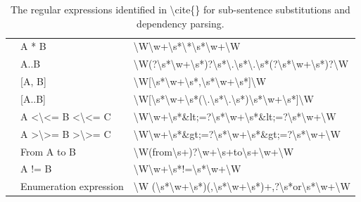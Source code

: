 \begin{table}[]
\begin{tabular}{|l|l|l|}
		& A * B & \textbackslash{}W\textbackslash{}w+\textbackslash{}s*\textbackslash{}*\textbackslash{}s*\textbackslash{}w+\textbackslash{}W \\ \cline{2-3} 
		& A..B & \textbackslash{}W(?\textbackslash{}s*\textbackslash{}w+\textbackslash{}s*)?\textbackslash{}s*\textbackslash{}.\textbackslash{}s*\textbackslash{}.\textbackslash{}s*(?\textbackslash{}s*\textbackslash{}w+\textbackslash{}s*)?\textbackslash{}W \\ \cline{2-3} 
		& {[}A, B{]} & \textbackslash{}W[\textbackslash{}s*\textbackslash{}w+\textbackslash{}s*,\textbackslash{}s*\textbackslash{}w+\textbackslash{}s*]\textbackslash{}W \\ \cline{2-3} 
		& {[}A..B{]} & \textbackslash{}W[\textbackslash{}s*\textbackslash{}w+\textbackslash{}s*(\textbackslash{}.\textbackslash{}s*\textbackslash{}.\textbackslash{}s*)\textbackslash{}s*\textbackslash{}w+\textbackslash{}s*]\textbackslash{}W \\ \cline{2-3} 
		& A \textless{}\textbackslash{}\textless{}= B \textless{}\textbackslash{}\textless{}= C & \textbackslash{}W\textbackslash{}w+\textbackslash{}s*\&lt;=?\textbackslash{}s*\textbackslash{}w+\textbackslash{}s*\&lt;=?\textbackslash{}s*\textbackslash{}w+\textbackslash{}W \\ \cline{2-3} 
		& A \textgreater{}\textbackslash{}\textgreater{}= B \textgreater{}\textbackslash{}\textgreater{}= C & \textbackslash{}W\textbackslash{}w+\textbackslash{}s*\&gt;=?\textbackslash{}s*\textbackslash{}w+\textbackslash{}s*\&gt;=?\textbackslash{}s*\textbackslash{}w+\textbackslash{}W \\ \cline{2-3} 
		& From A to B & \textbackslash{}W(from\textbackslash{}s+)?\textbackslash{}w+\textbackslash{}s+to\textbackslash{}s+\textbackslash{}w+\textbackslash{}W \\ \cline{2-3} 
		& A != B & \textbackslash{}W\textbackslash{}w+\textbackslash{}s*!=\textbackslash{}s*\textbackslash{}w+\textbackslash{}W \\ \cline{2-3} 
		& Enumeration expression & \textbackslash{}W (\textbackslash{}s*\textbackslash{}w+\textbackslash{}s*)(,\textbackslash{}s*\textbackslash{}w+\textbackslash{}s*)+,?\textbackslash{}s*or\textbackslash{}s*\textbackslash{}w+\textbackslash{}W \\ \hline
	\end{tabular}
	\caption{The regular expressions identified in \textbackslash{}cite\{\} for sub-sentence substitutions and dependency parsing.}
	\label{tab:zhou-regex}
\end{table}

